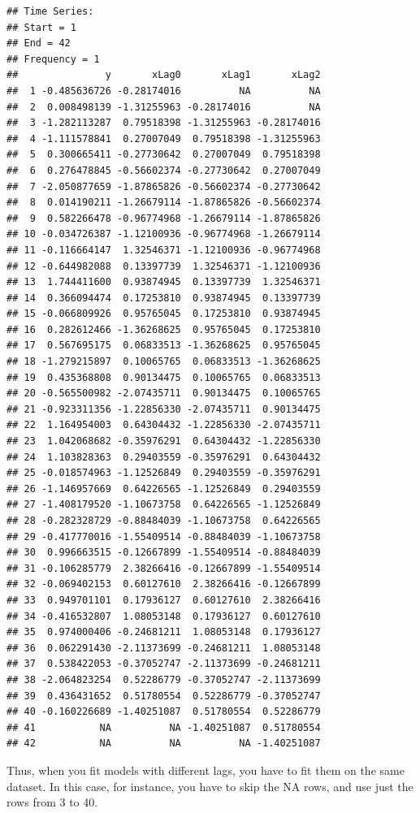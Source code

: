 \documentclass[
]{article}
\begin{document}
\begin{verbatim}
## Time Series:
## Start = 1 
## End = 42 
## Frequency = 1 
##               y       xLag0       xLag1       xLag2
##  1 -0.485636726 -0.28174016          NA          NA
##  2  0.008498139 -1.31255963 -0.28174016          NA
##  3 -1.282113287  0.79518398 -1.31255963 -0.28174016
##  4 -1.111578841  0.27007049  0.79518398 -1.31255963
##  5  0.300665411 -0.27730642  0.27007049  0.79518398
##  6  0.276478845 -0.56602374 -0.27730642  0.27007049
##  7 -2.050877659 -1.87865826 -0.56602374 -0.27730642
##  8  0.014190211 -1.26679114 -1.87865826 -0.56602374
##  9  0.582266478 -0.96774968 -1.26679114 -1.87865826
## 10 -0.034726387 -1.12100936 -0.96774968 -1.26679114
## 11 -0.116664147  1.32546371 -1.12100936 -0.96774968
## 12 -0.644982088  0.13397739  1.32546371 -1.12100936
## 13  1.744411600  0.93874945  0.13397739  1.32546371
## 14  0.366094474  0.17253810  0.93874945  0.13397739
## 15 -0.066809926  0.95765045  0.17253810  0.93874945
## 16  0.282612466 -1.36268625  0.95765045  0.17253810
## 17  0.567695175  0.06833513 -1.36268625  0.95765045
## 18 -1.279215897  0.10065765  0.06833513 -1.36268625
## 19  0.435368808  0.90134475  0.10065765  0.06833513
## 20 -0.565500982 -2.07435711  0.90134475  0.10065765
## 21 -0.923311356 -1.22856330 -2.07435711  0.90134475
## 22  1.164954003  0.64304432 -1.22856330 -2.07435711
## 23  1.042068682 -0.35976291  0.64304432 -1.22856330
## 24  1.103828363  0.29403559 -0.35976291  0.64304432
## 25 -0.018574963 -1.12526849  0.29403559 -0.35976291
## 26 -1.146957669  0.64226565 -1.12526849  0.29403559
## 27 -1.408179520 -1.10673758  0.64226565 -1.12526849
## 28 -0.282328729 -0.88484039 -1.10673758  0.64226565
## 29 -0.417770016 -1.55409514 -0.88484039 -1.10673758
## 30  0.996663515 -0.12667899 -1.55409514 -0.88484039
## 31 -0.106285779  2.38266416 -0.12667899 -1.55409514
## 32 -0.069402153  0.60127610  2.38266416 -0.12667899
## 33  0.949701101  0.17936127  0.60127610  2.38266416
## 34 -0.416532807  1.08053148  0.17936127  0.60127610
## 35  0.974000406 -0.24681211  1.08053148  0.17936127
## 36  0.062291430 -2.11373699 -0.24681211  1.08053148
## 37  0.538422053 -0.37052747 -2.11373699 -0.24681211
## 38 -2.064823254  0.52286779 -0.37052747 -2.11373699
## 39  0.436431652  0.51780554  0.52286779 -0.37052747
## 40 -0.160226689 -1.40251087  0.51780554  0.52286779
## 41           NA          NA -1.40251087  0.51780554
## 42           NA          NA          NA -1.40251087
\end{verbatim}

Thus, when you fit models with different lags, you have to fit them on the same dataset. In this case, for instance, you have to skip the NA rows, and use just the rows from 3 to 40.
\end{document}
